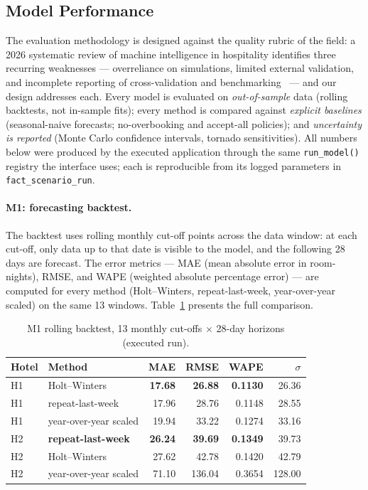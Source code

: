 \subsection{Model Performance}

The evaluation methodology is designed against the quality rubric of the field: a 2026 systematic review of machine intelligence in hospitality identifies three recurring weaknesses --- overreliance on simulations, limited external validation, and incomplete reporting of cross-validation and benchmarking~\cite{jawabreh2026} --- and our design addresses each. Every model is evaluated on \emph{out-of-sample} data (rolling backtests, not in-sample fits); every method is compared against \emph{explicit baselines} (seasonal-naive forecasts; no-overbooking and accept-all policies); and \emph{uncertainty is reported} (Monte Carlo confidence intervals, tornado sensitivities). All numbers below were produced by the executed application through the same \texttt{run\_model()} registry the interface uses; each is reproducible from its logged parameters in \texttt{fact\_scenario\_run}.

\paragraph{M1: forecasting backtest.}
The backtest uses rolling monthly cut-off points across the data window: at each cut-off, only data up to that date is visible to the model, and the following 28 days are forecast. The error metrics --- MAE (mean absolute error in room-nights), RMSE, and WAPE (weighted absolute percentage error) --- are computed for every method (Holt--Winters, repeat-last-week, year-over-year scaled) on the same 13 windows. Table~\ref{tab:backtest} presents the full comparison.

\begin{table}[H]
\centering
\caption{M1 rolling backtest, 13 monthly cut-offs $\times$ 28-day horizons (executed run).}
\label{tab:backtest}
\begin{tabular}{@{}llrrrr@{}}
\toprule
\textbf{Hotel} & \textbf{Method} & \textbf{MAE} & \textbf{RMSE} & \textbf{WAPE} & $\sigma$ \\
\midrule
H1 & Holt--Winters & \textbf{17.68} & \textbf{26.88} & \textbf{0.1130} & 26.36 \\
H1 & repeat-last-week & 17.96 & 28.76 & 0.1148 & 28.55 \\
H1 & year-over-year scaled & 19.94 & 33.22 & 0.1274 & 33.16 \\
\midrule
H2 & \textbf{repeat-last-week} & \textbf{26.24} & \textbf{39.69} & \textbf{0.1349} & 39.73 \\
H2 & Holt--Winters & 27.62 & 42.78 & 0.1420 & 42.79 \\
H2 & year-over-year scaled & 71.10 & 136.04 & 0.3654 & 128.00 \\
\bottomrule
\end{tabular}
\end{table}

